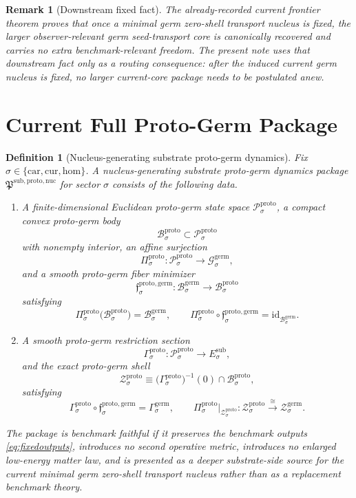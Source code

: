\documentclass[11pt]{article}
\newcommand{\Car}{\mathrm{car}}
\newcommand{\Cur}{\mathrm{cur}}
\newcommand{\Hom}{\mathrm{hom}}
\newcommand{\SubTarget}[1]{E_{#1}^{\mathrm{sub}}}
\newcommand{\GermState}[1]{\mathcal G_{#1}^{\mathrm{germ}}}
\newcommand{\GermBody}[1]{\mathcal B_{#1}^{\mathrm{germ}}}
\newcommand{\GermSection}[1]{\Gamma_{#1}^{\mathrm{germ}}}
\newcommand{\GermShell}[1]{\mathcal Z_{#1}^{\mathrm{germ}}}
\newcommand{\ProtoPackage}{\mathfrak P^{\mathrm{sub,proto,nuc}}}
\newcommand{\ProtoState}[1]{\mathcal P_{#1}^{\mathrm{proto}}}
\newcommand{\ProtoBody}[1]{\mathcal B_{#1}^{\mathrm{proto}}}
\newcommand{\ProtoProj}[1]{\Pi_{#1}^{\mathrm{proto}}}
\newcommand{\ProtoGermMin}[1]{\mathfrak f_{#1}^{\mathrm{proto,germ}}}
\newcommand{\ProtoSection}[1]{\Gamma_{#1}^{\mathrm{proto}}}
\newcommand{\ProtoShell}[1]{\mathcal Z_{#1}^{\mathrm{proto}}}
\newtheorem{definition}{Definition}
\newtheorem{remark}{Remark}
\begin{document}
\begin{remark}[Downstream fixed fact]
\label{rem:downstream}
The already-recorded current frontier theorem proves that once a minimal germ zero-shell transport nucleus is fixed, the larger observer-relevant germ seed-transport core is canonically recovered and carries no extra benchmark-relevant freedom. The present note uses that downstream fact only as a routing consequence: after the induced current germ nucleus is fixed, no larger current-core package needs to be postulated anew.
\end{remark}

\section{Current Full Proto-Germ Package}

\begin{definition}[Nucleus-generating substrate proto-germ dynamics]
\label{def:proto}
Fix \(\sigma\in\{\Car,\Cur,\Hom\}\). A nucleus-generating substrate proto-germ dynamics package \(\ProtoPackage\) for sector \(\sigma\) consists of the following data.
\begin{enumerate}
    \item A finite-dimensional Euclidean proto-germ state space \(\ProtoState{\sigma}\), a compact convex proto-germ body
    \[
    \ProtoBody{\sigma}\subset\ProtoState{\sigma}
    \]
    with nonempty interior, an affine surjection
    \[
    \ProtoProj{\sigma}:\ProtoState{\sigma}\to\GermState{\sigma},
    \]
    and a smooth proto-germ fiber minimizer
    \[
    \ProtoGermMin{\sigma}:\GermBody{\sigma}\to\ProtoBody{\sigma}
    \]
    satisfying
    \[
    \ProtoProj{\sigma}\bigl(\ProtoBody{\sigma}\bigr)=\GermBody{\sigma},
    \qquad
    \ProtoProj{\sigma}\circ\ProtoGermMin{\sigma}
    =
    \mathrm{id}_{\GermBody{\sigma}}.
    \]
    \item A smooth proto-germ restriction section
    \[
    \ProtoSection{\sigma}:\ProtoState{\sigma}\to\SubTarget{\sigma},
    \]
    and the exact proto-germ shell
    \[
    \ProtoShell{\sigma}
    \equiv
    \bigl(\ProtoSection{\sigma}\bigr)^{-1}(0)\cap\ProtoBody{\sigma},
    \]
    satisfying
    \[
    \ProtoSection{\sigma}\circ\ProtoGermMin{\sigma}
    =
    \GermSection{\sigma},
    \qquad
    \ProtoProj{\sigma}\big|_{\ProtoShell{\sigma}}
    :
    \ProtoShell{\sigma}
    \xrightarrow{\cong}
    \GermShell{\sigma}.
    \]
\end{enumerate}
The package is \emph{benchmark faithful} if it preserves the benchmark outputs \eqref{eq:fixedoutputs}, introduces no second operative metric, introduces no enlarged low-energy matter law, and is presented as a deeper substrate-side source for the current minimal germ zero-shell transport nucleus rather than as a replacement benchmark theory.
\end{definition}
\end{document}

